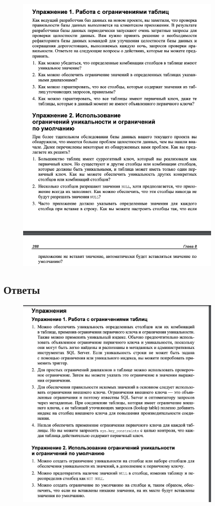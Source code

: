 \begin{figure}[h!]
	\begin{center}
		\includegraphics[width=0.9\textwidth]{img/ex14.png}
	\end{center}
	\captionsetup{justification=centering}
\end{figure}

\subsection*{Ответы}

\begin{figure}[h!]
	\begin{center}
		\includegraphics[width=0.9\textwidth]{img/ans18.png}
	\end{center}
	\captionsetup{justification=centering}
\end{figure}





